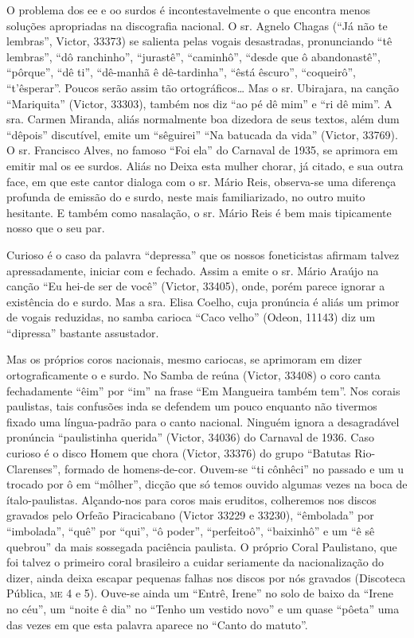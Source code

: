 O problema dos ee e oo surdos é incontestavelmente o que encontra menos
soluções apropriadas na discografia nacional. O sr. Agnelo Chagas (``Já
não te lembras'', Victor, 33373) se salienta pelas vogais desastradas,
pronunciando ``tê lembras'', ``dô ranchinho'', ``jurastê'', ``caminhô'',
``desde que ô abandonastê'', ``pôrque'', ``dê ti'', ``dê-manhã ê
dê-tardinha'', ``êstá êscuro'', ``coqueirô'', ``t'êsperar''. Poucos
serão assim tão ortográficos\ldots{} Mas o sr. Ubirajara, na canção
``Mariquita'' (Victor, 33303), também nos diz ``ao pé dê mim'' e ``ri dê
mim''. A sra. Carmen Miranda, aliás normalmente boa dizedora de seus
textos, além dum ``dêpois'' discutível, emite um ``sêguirei'' ``Na
batucada da vida'' (Victor, 33769). O sr. Francisco Alves, no famoso
``Foi ela'' do Carnaval de 1935, se aprimora em emitir mal os ee surdos.
Aliás no Deixa esta mulher chorar, já citado, e sua outra face, em que
este cantor dialoga com o sr. Mário Reis, observa-se uma diferença
profunda de emissão do e surdo, neste mais familiarizado, no outro muito
hesitante. E também como nasalação, o sr. Mário Reis é bem mais
tipicamente nosso que o seu par.

Curioso é o caso da palavra ``depressa'' que os nossos foneticistas
afirmam talvez apressadamente, iniciar com e fechado. Assim a emite o
sr. Mário Araújo na canção ``Eu hei-de ser de você'' (Victor, 33405),
onde, porém parece ignorar a existência do e surdo. Mas a sra. Elisa
Coelho, cuja pronúncia é aliás um primor de vogais reduzidas, no samba
carioca ``Caco velho'' (Odeon, 11143) diz um ``dipressa'' bastante
assustador.

Mas os próprios coros nacionais, mesmo cariocas, se aprimoram em dizer
ortograficamente o e surdo. No Samba de reúna (Victor, 33408) o coro
canta fechadamente ``êim'' por ``im'' na frase ``Em Mangueira também
tem''. Nos corais paulistas, tais confusões inda se defendem um pouco
enquanto não tivermos fixado uma língua-padrão para o canto nacional.
Ninguém ignora a desagradável pronúncia ``paulistinha querida'' (Victor,
34036) do Carnaval de 1936. Caso curioso é o disco Homem que chora
(Victor, 33376) do grupo ``Batutas Rio-Clarenses'', formado de
homens-de-cor. Ouvem-se ``ti cônhêci'' no passado e um u trocado por ô
em ``môlher'', dicção que só temos ouvido algumas vezes na boca de
ítalo-paulistas. Alçando-nos para coros mais eruditos, colheremos nos
discos gravados pelo Orfeão Piracicabano (Victor 33229 e 33230),
``êmbolada'' por ``imbolada'', ``quê'' por ``qui'', ``ô poder'',
``perfeitoô'', ``baixinhô'' e um ``ê sê quebrou'' da mais sossegada
paciência paulista. O próprio Coral Paulistano, que foi talvez o
primeiro coral brasileiro a cuidar seriamente da nacionalização do
dizer, ainda deixa escapar pequenas falhas nos discos por nós gravados
(Discoteca Pública, \textsc{me} 4 e 5). Ouve-se ainda um ``Entrê, Irene'' no solo
de baixo da ``Irene no céu'', um ``noite ê dia'' no ``Tenho um vestido
novo'' e um quase ``pôeta'' uma das vezes em que esta palavra aparece no
``Canto do matuto''.

